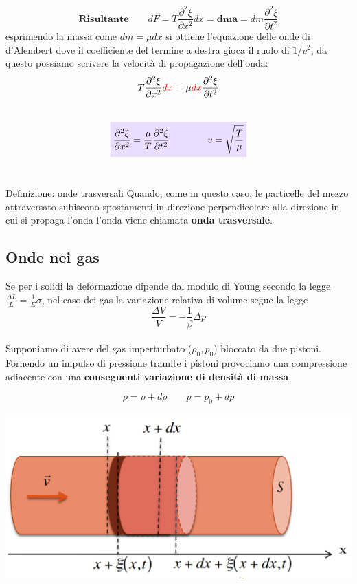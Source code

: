 \documentclass[x11names]{report}
\newcommand{\viola}[1]{\colorbox{yred}{$\displaystyle #1$}}
\begin{document}
	\[ 
	\textbf{Risultante} \qquad	dF =  T\frac{\partial^2 \xi}{\partial x^2}dx  \mathbf{= dm a} = dm \frac{\partial^2 \xi}{\partial t^2} 
	\]
	esprimendo la massa come \(dm = \mu dx\) si ottiene l'equazione delle onde di d'Alembert dove il coefficiente del termine a destra gioca il ruolo di \(1/v^2\), da questo possiamo scrivere la velocità di propagazione dell'onda:
	\[ 
	T\frac{\partial^2\xi}{\partial x^2}\textcolor{red}{dx} = \mu \textcolor{red}{dx} \frac{\partial^2 \xi}{\partial t^2}
	\]
	\\
	\begin{equation}\label{corda}
		\viola{	\frac{\partial^2\xi}{\partial x^2} = \frac{\mu}{T} \frac{\partial^2 \xi}{\partial t^2} \qquad \qquad v = \sqrt{\frac{T}{\mu}}}
	\end{equation}
	\\
	
	\begin{center}
		\colorbox{yblue}{\begin{minipage}{5.75in}
				\begin{blues}{Definizione: onde trasversali}
					Quando, come in questo caso, le particelle del mezzo attraversato subiscono spostamenti in direzione perpendicolare alla direzione in cui si propaga l'onda l'onda viene chiamata \textbf{onda trasversale}.
				\end{blues}
		\end{minipage}}
	\end{center}
	
	\newpage
	\subsection{Onde nei gas}
	Se per i solidi la deformazione dipende dal modulo di Young secondo la legge \(\frac{\Delta L}{L} = \frac{1}{E}\sigma\), nel caso dei gas la variazione relativa di volume segue la legge
	\[ 
	\frac{\Delta V}{V} = -\frac{1}{\beta} \Delta p
	\] \\
	
	\noindent
	Supponiamo di avere del gas imperturbato (\(\rho_0, p_0\)) bloccato da due pistoni. Fornendo un impulso di pressione tramite i pistoni provociamo una compressione adiacente con una \textbf{conseguenti variazione di densità di massa}.
	
	\[
	\rho = \rho + d\rho \qquad p = p_0 + dp
	\]
	
	\begin{center}
		\includegraphics[scale=0.3]{imgs/ondeingas.png}
	\end{center}
	
\end{document}
